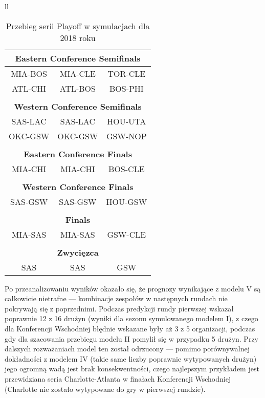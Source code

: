\documentclass[inzynierska]{pwr_wmat_praca_dyplomowa}
\theoremstyle{plain}
\numberwithin{theorem}{chapter}
\theoremstyle{definition}
\numberwithin{theorem}{chapter}
\begin{document}
\begin{table}[]
\begin{tabular}{ll}
\begin{tabular}{ |c|c|c|  }
		\multicolumn{3}{|c|}{\textbf{Eastern Conference Semifinals}} \\\hline
		MIA-BOS& MIA-CLE&TOR-CLE\\\hline
		ATL-CHI& ATL-BOS&BOS-PHI\\\hline
		\multicolumn{3}{|c|}{} \\\hline
		
		\multicolumn{3}{|c|}{\textbf{Western Conference Semifinals}} \\\hline
		SAS-LAC& SAS-LAC&HOU-UTA\\\hline
		OKC-GSW& OKC-GSW&GSW-NOP\\\hline
		\multicolumn{3}{|c|}{} \\\hline
		
		\multicolumn{3}{|c|}{\textbf{Eastern Conference Finals}} \\\hline
		MIA-CHI& MIA-CHI&BOS-CLE\\\hline
		\multicolumn{3}{|c|}{} \\\hline
		
		\multicolumn{3}{|c|}{\textbf{Western Conference Finals}} \\\hline
		SAS-GSW& SAS-GSW&HOU-GSW\\\hline
		\multicolumn{3}{|c|}{} \\\hline
		
		\multicolumn{3}{|c|}{\textbf{Finals}} \\\hline
		MIA-SAS&  MIA-SAS&GSW-CLE\\\hline
		\multicolumn{3}{|c|}{} \\\hline
		
		\multicolumn{3}{|c|}{\textbf{Zwycięzca}} \\\hline
		SAS&  SAS&GSW\\\hline
	\end{tabular}
\end{tabular}
	\caption{Przebieg serii Playoff w symulacjach dla 2018 roku}\label{tabela_playoffs2018}
\end{table}

Po przeanalizowaniu wyników okazało się, że prognozy wynikające z modelu V są całkowicie nietrafne --- kombinacje zespołów w następnych rundach nie pokrywają się z poprzednimi. Podczas predykcji rundy pierwszej wskazał poprawnie 12 z 16 drużyn (wyniki dla sezonu symulowanego modelem I), z czego dla Konferencji Wschodniej błędnie wskazane były aż 3 z 5 organizacji, podczas gdy dla szacowania przebiegu modelu II pomylił się w przypadku 5 drużyn. Przy dalszych rozważaniach model ten został odrzucony --- pomimo porównywalnej dokładności z modelem IV (takie same liczby poprawnie wytypowanych drużyn) jego ogromną wadą jest brak konsekwentności, czego najlepszym przykładem jest przewidziana seria Charlotte-Atlanta w finałach Konferencji Wschodniej (Charlotte nie zostało wytypowane do gry w pierwszej rundzie).
 
\end{document}
